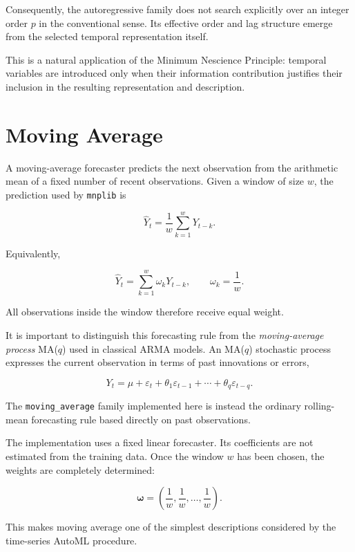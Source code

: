 Consequently, the autoregressive family does not search explicitly over an
integer order \(p\) in the conventional sense. Its effective order and lag
structure emerge from the selected temporal representation itself.

This is a natural application of the Minimum Nescience Principle: temporal
variables are introduced only when their information contribution justifies
their inclusion in the resulting representation and description.


%
%

\section{Moving Average}
\label{subsec:automl_moving_average}

A moving-average forecaster predicts the next observation from the arithmetic
mean of a fixed number of recent observations. Given a window of size \(w\),
the prediction used by \texttt{mnplib} is

\[
\widehat Y_t
=
\frac{1}{w}
\sum_{k=1}^{w}
Y_{t-k}.
\]

Equivalently,

\[
\widehat Y_t
=
\sum_{k=1}^{w}
\omega_k Y_{t-k},
\qquad
\omega_k=\frac{1}{w}.
\]

All observations inside the window therefore receive equal weight.

It is important to distinguish this forecasting rule from the
\emph{moving-average process} MA(\(q\)) used in classical ARMA models. An
MA(\(q\)) stochastic process expresses the current observation in terms of past
innovations or errors,

\[
Y_t
=
\mu
+
\varepsilon_t
+
\theta_1\varepsilon_{t-1}
+\cdots+
\theta_q\varepsilon_{t-q}.
\]

The \texttt{moving\_average} family implemented here is instead the ordinary
rolling-mean forecasting rule based directly on past observations.

The implementation uses a fixed linear forecaster. Its coefficients are not
estimated from the training data. Once the window \(w\) has been chosen, the
weights are completely determined:

\[
\boldsymbol{\omega}
=
\left(
\frac1w,\frac1w,\ldots,\frac1w
\right).
\]

This makes moving average one of the simplest descriptions considered by the
time-series AutoML procedure.

